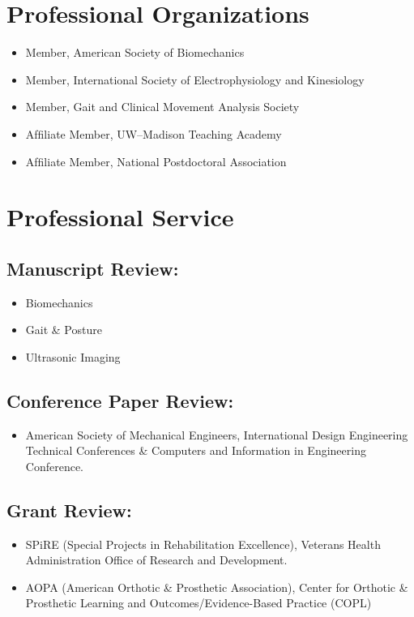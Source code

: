 \documentclass[letterpaper, 10pt]{article}
\begin{document}
\section{Professional Organizations}
\begin{itemize}
     \item Member, American Society of Biomechanics
     \item Member, International Society of Electrophysiology and Kinesiology
     \item Member, Gait and Clinical Movement Analysis Society
     \item Afﬁliate Member, UW--Madison Teaching Academy 
     \item Afﬁliate Member, National Postdoctoral Association
\end{itemize}

\section{Professional Service}
\subsection{Manuscript Review:}
\begin{itemize}
    \item Biomechanics
    \item Gait \& Posture
    \item Ultrasonic Imaging
\end{itemize}

\subsection{Conference Paper Review:}
\begin{itemize}
    \item American Society of Mechanical Engineers, International Design Engineering Technical Conferences \& Computers and Information in Engineering Conference.
\end{itemize}

\subsection{Grant Review:}
\begin{itemize}
    \item SPiRE (Special Projects in Rehabilitation Excellence), Veterans Health Administration Office of Research and Development.
    \item AOPA (American Orthotic \& Prosthetic Association), Center for Orthotic \& Prosthetic Learning and Outcomes/Evidence-Based Practice (COPL)
\end{itemize}
\end{document}
